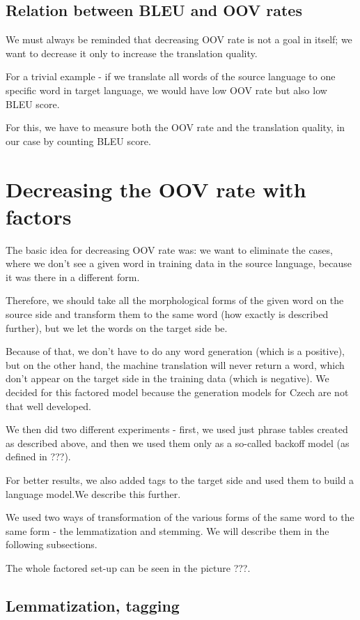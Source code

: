 \documentclass[11pt,letterpaper]{article}
\begin{document}
\subsection{Relation between BLEU and OOV rates}
We must always be reminded that decreasing OOV rate is not a goal in itself; we want to decrease it only to increase the translation quality.

For a trivial example - if we translate all words of the source language to one specific word in target language, we would have low OOV rate but also low BLEU score.

For this, we have to measure both the OOV rate and the translation quality, in our case by counting BLEU score.


\section{Decreasing the OOV rate with factors}
The basic idea for decreasing OOV rate was: we want to eliminate the cases, where we don't see a given word in training data in the source language, because it was there in a different form.

Therefore, we should take all the morphological forms of the given word on the source side and transform them to the same word (how exactly is described further), but we let the words on the target side be.

Because of that, we don't have to do any word generation (which is a positive), but on the other hand, the machine translation will never return a word, which don't appear on the target side in the training data (which is negative). We decided for this factored model because the generation models for Czech are not that well developed.

We then did two different experiments - first, we used just phrase tables created as described above, and then we used them only as a so-called backoff model (as defined in ???).

For better results, we also added tags to the target side and used them to build a language model.We describe this further.

We used two ways of transformation of the various forms of the same word to the same form - the lemmatization and stemming. We will describe them in the following subsections.

The whole factored set-up can be seen in the picture ???.

\subsection{Lemmatization, tagging}
\end{document}
